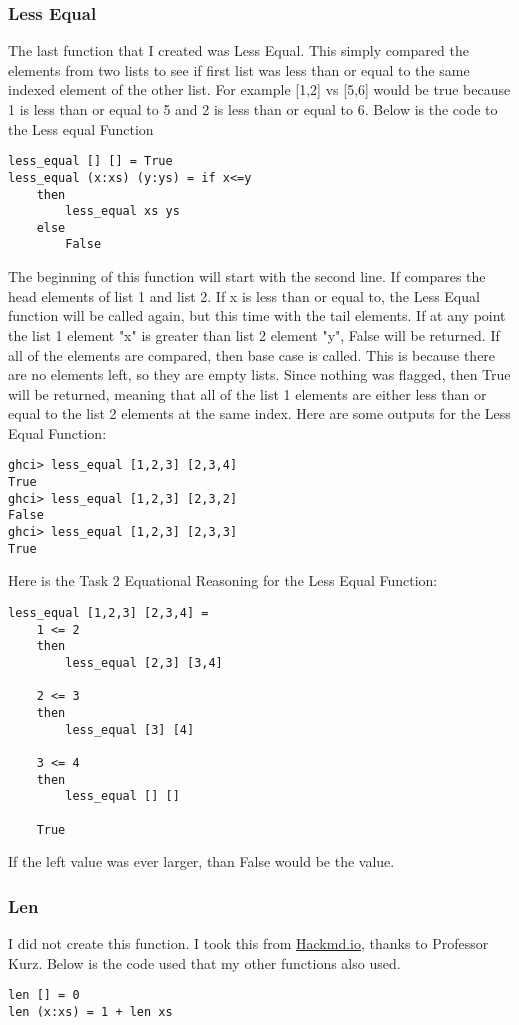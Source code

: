 \documentclass{article}
\theoremstyle{theorem}
\theoremstyle{definition}
\theoremstyle{remark}
\begin{document}
\subsubsection{Less Equal}
The last function that I created was Less Equal. This simply compared the elements from two lists to see if first list was less than or equal to the same indexed element of the other list. For example [1,2] vs [5,6] would be true because 1 is less than or equal to 5 and 2 is less than or equal to 6.\newline
\newline Below is the code to the Less equal Function
\begin{verbatim}
less_equal [] [] = True
less_equal (x:xs) (y:ys) = if x<=y
    then 
        less_equal xs ys
    else
        False
\end{verbatim}
The beginning of this function will start with the second line. If compares the head elements of list 1 and list 2. If x is less than or equal to, the Less Equal function will be called again, but this time with the tail elements. If at any point the list 1 element "x" is greater than list 2 element "y", False will be returned. If all of the elements are compared, then base case is called. This is because there are no elements left, so they are empty lists. Since nothing was flagged, then True will be returned, meaning that all of the list 1 elements are either less than or equal to the list 2 elements at the same index.\newline
\newline Here are some outputs for the Less Equal Function:
\begin{verbatim}
ghci> less_equal [1,2,3] [2,3,4]
True
ghci> less_equal [1,2,3] [2,3,2]
False
ghci> less_equal [1,2,3] [2,3,3]
True
\end{verbatim}
\noindent\newline\newline Here is the Task 2 Equational Reasoning for the Less Equal Function:
\begin{verbatim}
less_equal [1,2,3] [2,3,4] =
    1 <= 2
    then
        less_equal [2,3] [3,4]

    2 <= 3
    then
        less_equal [3] [4]
    
    3 <= 4
    then
        less_equal [] []
    
    True
\end{verbatim}
\noindent\newline If the left value was ever larger, than False would be the value.
\subsubsection{Len}
I did not create this function. I took this from \href{https://hackmd.io/@alexhkurz/H1jUka4Gv#fn2}{Hackmd.io}, thanks to Professor Kurz. Below is the code used that my other functions also used.
\begin{verbatim}
len [] = 0
len (x:xs) = 1 + len xs
\end{verbatim}
\end{document}
